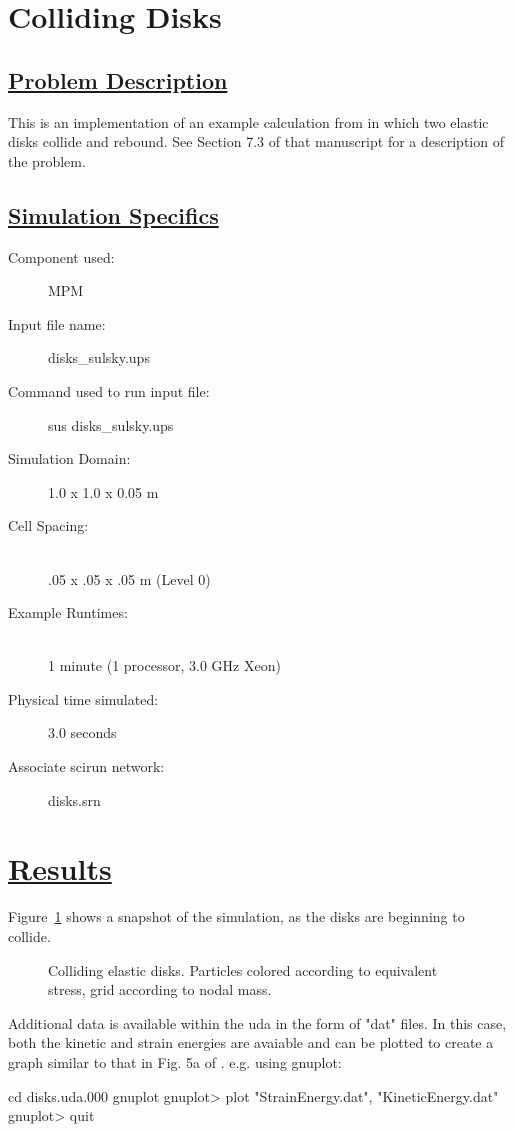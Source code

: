 \documentclass[fleqn]{article}
\begin{document}
\section*{\center Colliding Disks}
\subsection*{\underline{Problem Description}}
This is an implementation of an example calculation from \cite{sulskycmame} in
which two elastic disks collide and rebound.  See Section 7.3 of that
manuscript for a description of the problem.
 
\subsection*{\underline{Simulation Specifics}}
\begin{description} 
\item [Component used:] \hfill MPM
\item [Input file name:] \hfill disks_sulsky.ups
\item [Command used to run input file:]\hfill sus disks_sulsky.ups
\item [Simulation Domain:]\hfill    1.0 x 1.0 x 0.05 m

\item [Cell Spacing:]\hfill \\ 
.05 x .05 x .05 m (Level 0)

\item [Example Runtimes:] \hfill \\
 1 minute   (1 processor, 3.0 GHz Xeon)\\

\item [Physical time simulated:] \hfill 3.0 seconds

\item [Associate scirun network:] \hfill disks.srn

\end{description}

\section*{\underline{Results}}

Figure~\ref{figdisks} shows a snapshot of the simulation, as the disks
are beginning to collide.
\begin{figure}[b]
  \center
  \caption{Colliding elastic disks.  Particles colored according to
equivalent stress, grid according to nodal mass.}
  \label{figdisks}
\end{figure}

Additional data is available within the uda in the form of "dat" files.
In this case, both the kinetic and strain energies are avaiable and can
be plotted to create a graph similar to that in Fig. 5a of \cite{sulskycmame}.
e.g. using gnuplot:

cd disks.uda.000
gnuplot
gnuplot> plot "StrainEnergy.dat", "KineticEnergy.dat"
gnuplot> quit


\end{document}
